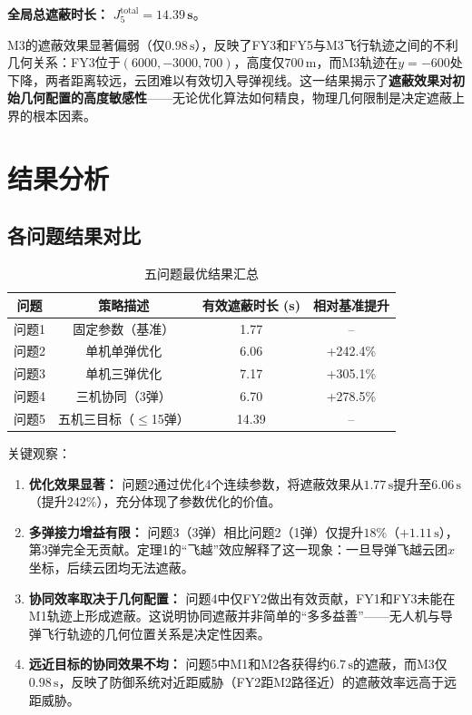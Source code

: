 \documentclass[12pt,a4paper]{ctexart}
\begin{document}
\textbf{全局总遮蔽时长：} $J_5^{\text{total}} = \mathbf{14.39\,\text{s}}$。

M3的遮蔽效果显著偏弱（仅$0.98\,\text{s}$），反映了FY3和FY5与M3飞行轨迹之间的不利几何关系：FY3位于$(6000,-3000,700)$，高度仅$700\,\text{m}$，而M3轨迹在$y=-600$处下降，两者距离较远，云团难以有效切入导弹视线。这一结果揭示了\textbf{遮蔽效果对初始几何配置的高度敏感性}——无论优化算法如何精良，物理几何限制是决定遮蔽上界的根本因素。

\section{结果分析}

\subsection{各问题结果对比}

\begin{table}[H]
\centering
\caption{五问题最优结果汇总}
\label{tab:results}
\begin{tabular}{cccc}
\toprule
问题 & 策略描述 & 有效遮蔽时长 (s) & 相对基准提升 \\
\midrule
问题1 & 固定参数（基准） & 1.77 & -- \\
问题2 & 单机单弹优化 & 6.06 & +242.4\% \\
问题3 & 单机三弹优化 & 7.17 & +305.1\% \\
问题4 & 三机协同（3弹） & 6.70 & +278.5\% \\
问题5 & 五机三目标（$\leq$15弹） & 14.39 & -- \\
\bottomrule
\end{tabular}
\end{table}

关键观察：

\begin{enumerate}
    \item \textbf{优化效果显著：} 问题2通过优化4个连续参数，将遮蔽效果从$1.77\,\text{s}$提升至$6.06\,\text{s}$（提升$242\%$），充分体现了参数优化的价值。
    \item \textbf{多弹接力增益有限：} 问题3（3弹）相比问题2（1弹）仅提升$18\%$（$+1.11\,\text{s}$），第3弹完全无贡献。定理1的“飞越”效应解释了这一现象：一旦导弹飞越云团$x$坐标，后续云团均无法遮蔽。
    \item \textbf{协同效率取决于几何配置：} 问题4中仅FY2做出有效贡献，FY1和FY3未能在M1轨迹上形成遮蔽。这说明协同遮蔽并非简单的“多多益善”——无人机与导弹飞行轨迹的几何位置关系是决定性因素。
    \item \textbf{远近目标的协同效果不均：} 问题5中M1和M2各获得约$6.7\,\text{s}$的遮蔽，而M3仅$0.98\,\text{s}$，反映了防御系统对近距威胁（FY2距M2路径近）的遮蔽效率远高于远距威胁。
\end{enumerate}
\end{document}
